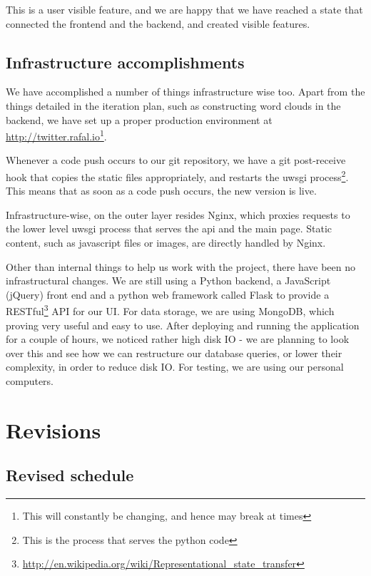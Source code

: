 \documentclass[a4paper,12pt]{article}
\begin{document}
	This is a user visible feature, and we are happy that we have reached a state that connected the frontend and the backend, and created visible features.
	
	\subsection{Infrastructure accomplishments}
	
	We have accomplished a number of things infrastructure wise too. Apart from the things detailed in the iteration plan, such as constructing word clouds in the backend, we have set up a proper production environment at \url{http://twitter.rafal.io}\footnote{This will constantly be changing, and hence may break at times}.
	
	Whenever a code push occurs to our git repository, we have a git post-receive hook that copies the static files appropriately, and restarts the uwsgi process\footnote{This is the process that serves the python code}. This means that as soon as a code push occurs, the new version is live.
 
	Infrastructure-wise, on the outer layer resides Nginx, which proxies requests to the lower level uwsgi process that serves the api and the main page. Static content, such as javascript files or images, are directly handled by Nginx.
	
	  Other than internal things to help us work with the project, there have been no infrastructural changes. We are still using a Python backend, a JavaScript (jQuery) front end and a python web framework called Flask to provide a RESTful\footnote{\url{http://en.wikipedia.org/wiki/Representational_state_transfer}} API for our UI. For data storage, we are using MongoDB, which proving very useful and easy to use. After deploying and running the application for a couple of hours, we noticed rather high disk IO - we are planning to look over this and see how we can restructure our database queries, or lower their complexity, in order to reduce disk IO. For testing, we are using our personal computers.
	
	\section{Revisions}
	
	\subsection{Revised schedule}
	
\end{document}
